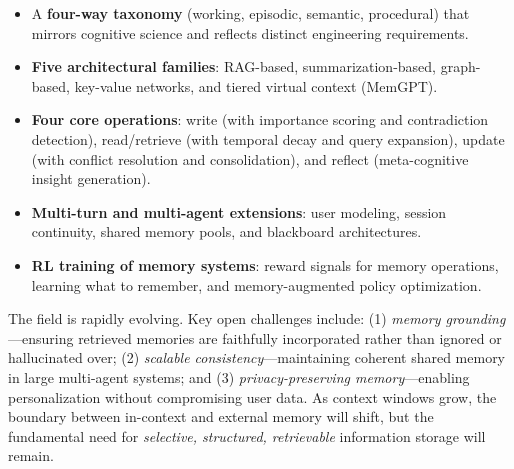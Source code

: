 \begin{itemize}
  \item A \textbf{four-way taxonomy} (working, episodic, semantic, procedural) that mirrors cognitive science and reflects distinct engineering requirements.
  \item \textbf{Five architectural families}: RAG-based, summarization-based, graph-based, key-value networks, and tiered virtual context (MemGPT).
  \item \textbf{Four core operations}: write (with importance scoring and contradiction detection), read/retrieve (with temporal decay and query expansion), update (with conflict resolution and consolidation), and reflect (meta-cognitive insight generation).
  \item \textbf{Multi-turn and multi-agent extensions}: user modeling, session continuity, shared memory pools, and blackboard architectures.
  \item \textbf{RL training of memory systems}: reward signals for memory operations, learning what to remember, and memory-augmented policy optimization.
\end{itemize}

The field is rapidly evolving. Key open challenges include: (1) \emph{memory grounding}---ensuring retrieved memories are faithfully incorporated rather than ignored or hallucinated over; (2) \emph{scalable consistency}---maintaining coherent shared memory in large multi-agent systems; and (3) \emph{privacy-preserving memory}---enabling personalization without compromising user data. As context windows grow, the boundary between in-context and external memory will shift, but the fundamental need for \emph{selective, structured, retrievable} information storage will remain.

